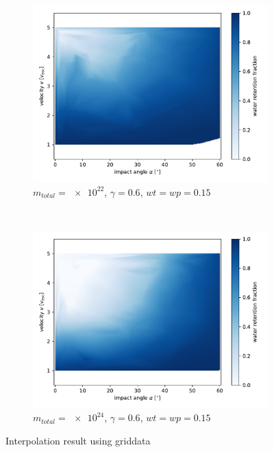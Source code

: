 \begin{figure}[h!] %
	\centering
	\begin{subfigure}[t]{0.5\textwidth}
		\centering
		\includegraphics[width=\linewidth]{images/plots/griddata1.pdf}
		\caption{$m_{total}=\num{e22}$, $\gamma=0.6$, $wt=wp=0.15$}
		\label{fig:griddata1}
	\end{subfigure}%
	~ 
	\begin{subfigure}[t]{0.5\textwidth}
		\centering
		\includegraphics[width=\linewidth]{images/plots/griddata2.pdf}
		\caption{$m_{total}=\num{e24}$, $\gamma=0.6$, $wt=wp=0.15$}
		\label{fig:griddata2}
	\end{subfigure}
	\caption{Interpolation result using griddata}
	\label{fig:griddataresults}
\end{figure}